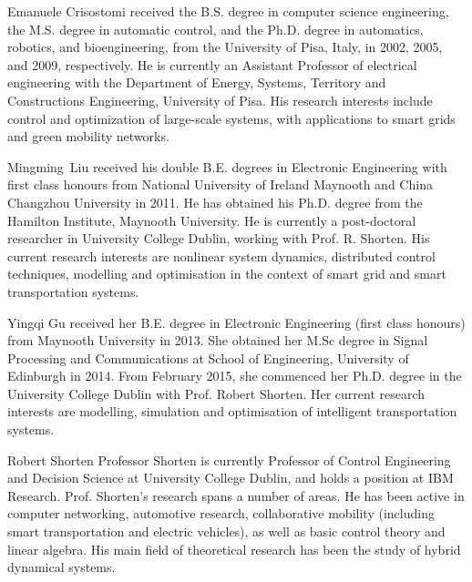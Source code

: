 \documentclass[journal]{IEEEtran}
\begin{document}
\begin{IEEEbiography}{Emanuele Crisostomi}
	received the B.S. degree in computer science engineering, the M.S. degree in automatic control, and the Ph.D. degree in automatics, robotics, and bioengineering, from the University of Pisa, Italy, in 2002, 2005, and 2009, respectively. He is currently an Assistant Professor of electrical engineering with the Department of Energy, Systems, Territory and Constructions Engineering, University of Pisa. His research interests include control and optimization of large-scale systems, with applications to smart grids and green mobility networks.
\end{IEEEbiography}


\begin{IEEEbiography}{Mingming~Liu}
	received his double B.E. degrees in Electronic Engineering with first class honours from National University of Ireland Maynooth and China Changzhou University in 2011. He has obtained his Ph.D. degree from the Hamilton Institute, Maynooth University. He is currently a post-doctoral researcher in University College Dublin, working with Prof. R. Shorten. His current research interests are nonlinear system dynamics, distributed control techniques, modelling and optimisation in the context of smart grid and smart transportation systems. 		
\end{IEEEbiography}


\begin{IEEEbiography}{Yingqi Gu}
	received her B.E. degree in Electronic Engineering (first class honours) from Maynooth University in 2013. She obtained her M.Sc degree in Signal Processing and Communications at School of Engineering, University of Edinburgh in 2014. From February 2015, she commenced her Ph.D. degree in the University College Dublin with Prof. Robert Shorten. Her current research interests are modelling, simulation and optimisation of intelligent transportation systems.   		
\end{IEEEbiography}


\begin{IEEEbiography}{Robert Shorten}
	Professor Shorten is currently Professor of Control Engineering and Decision Science at University College Dublin, and holds a position at IBM Research. Prof. Shorten's research spans a number of areas. He has been active in computer networking, automotive research, collaborative mobility (including smart transportation and electric vehicles), as well as basic control theory and linear algebra. His main field of theoretical research has been the study of hybrid dynamical systems.
\end{IEEEbiography}
\end{document}
